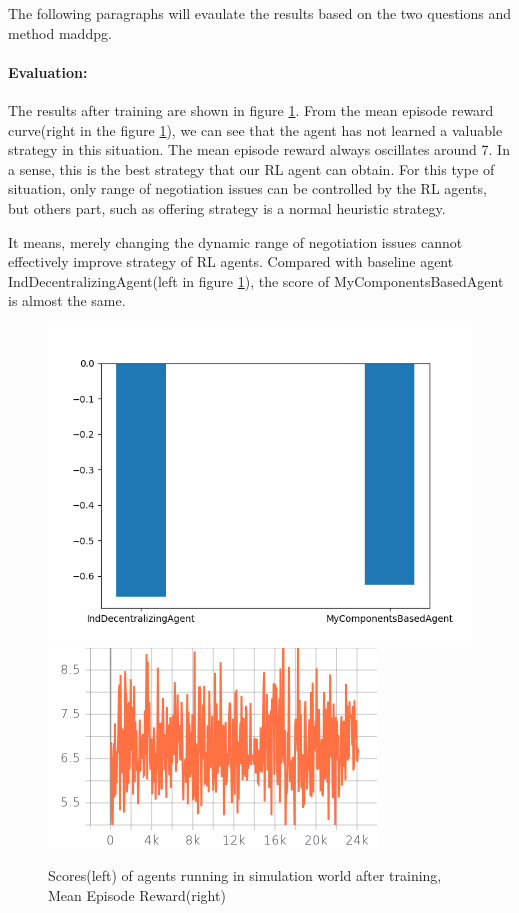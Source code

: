 The following paragraphs will evaulate the results based on the two questions and method maddpg. 

\paragraph{Evaluation:} The results after training are shown in figure \ref{fig:dynamical-range-issues-maddpg}. From the mean episode reward curve(right in the figure \ref{fig:dynamical-range-issues-maddpg}), we can see that the agent has not learned a valuable strategy in this situation. The mean episode reward always oscillates around 7. In a sense, this is the best strategy that our RL agent can obtain. For this type of situation,  only range of negotiation issues can be controlled by the RL agents, but others part, such as offering strategy is a normal heuristic strategy.

It means, merely changing the dynamic range of negotiation issues cannot effectively improve strategy of RL agents. Compared with baseline agent IndDecentralizingAgent(left in figure \ref{fig:dynamical-range-issues-maddpg}), the score of MyComponentsBasedAgent is almost the same.  

\begin{figure}
    \includegraphics[width=.45\textwidth]{./images/dynamic_range_issues_maddpg.png}\hfill
    \includegraphics[width=.49\textwidth]{./images/dynamical_mean_episode_reward.png}
    \caption{Scores(left) of agents running in simulation world after training, Mean Episode Reward(right)}
		\label{fig:dynamical-range-issues-maddpg}
\end{figure}

